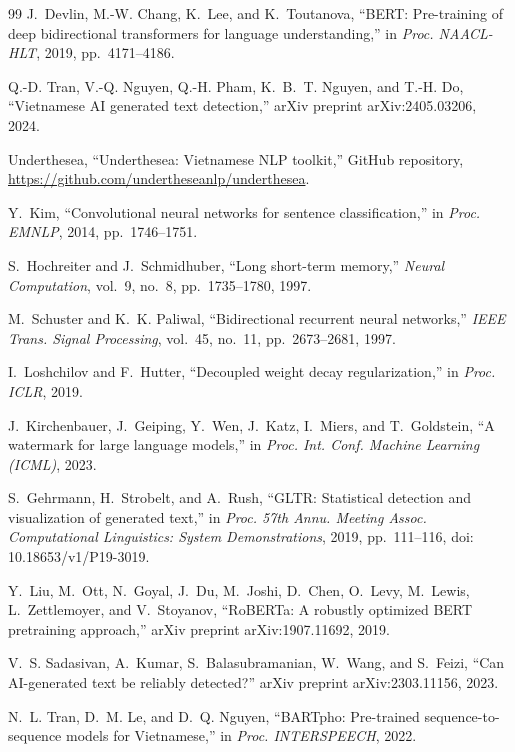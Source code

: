 \documentclass[conference,a4paper]{IEEEtran}
\begin{document}
\begin{thebibliography}{99}
J.~Devlin, M.-W. Chang, K.~Lee, and K.~Toutanova, ``BERT: Pre-training of deep bidirectional transformers for language understanding,'' in \emph{Proc. NAACL-HLT}, 2019, pp.~4171--4186.

Q.-D. Tran, V.-Q. Nguyen, Q.-H. Pham, K.~B.~T. Nguyen, and T.-H. Do, ``Vietnamese AI generated text detection,'' arXiv preprint arXiv:2405.03206, 2024.

Underthesea, ``Underthesea: Vietnamese NLP toolkit,'' GitHub repository, \url{https://github.com/undertheseanlp/underthesea}.

Y.~Kim, ``Convolutional neural networks for sentence classification,'' in \emph{Proc. EMNLP}, 2014, pp.~1746--1751.

S.~Hochreiter and J.~Schmidhuber, ``Long short-term memory,'' \emph{Neural Computation}, vol.~9, no.~8, pp.~1735--1780, 1997.

M.~Schuster and K.~K. Paliwal, ``Bidirectional recurrent neural networks,'' \emph{IEEE Trans. Signal Processing}, vol.~45, no.~11, pp.~2673--2681, 1997.

I.~Loshchilov and F.~Hutter, ``Decoupled weight decay regularization,'' in \emph{Proc. ICLR}, 2019.

J.~Kirchenbauer, J.~Geiping, Y.~Wen, J.~Katz, I.~Miers, and T.~Goldstein, ``A watermark for large language models,'' in \emph{Proc. Int. Conf. Machine Learning (ICML)}, 2023.

S.~Gehrmann, H.~Strobelt, and A.~Rush, ``GLTR: Statistical detection and visualization of generated text,'' in \emph{Proc. 57th Annu. Meeting Assoc. Computational Linguistics: System Demonstrations}, 2019, pp.~111--116, doi: 10.18653/v1/P19-3019.

Y.~Liu, M.~Ott, N.~Goyal, J.~Du, M.~Joshi, D.~Chen, O.~Levy, M.~Lewis, L.~Zettlemoyer, and V.~Stoyanov, ``RoBERTa: A robustly optimized BERT pretraining approach,'' arXiv preprint arXiv:1907.11692, 2019.

V.~S. Sadasivan, A.~Kumar, S.~Balasubramanian, W.~Wang, and S.~Feizi, ``Can AI-generated text be reliably detected?'' arXiv preprint arXiv:2303.11156, 2023.

N.~L. Tran, D.~M. Le, and D.~Q. Nguyen, ``BARTpho: Pre-trained sequence-to-sequence models for Vietnamese,'' in \emph{Proc. INTERSPEECH}, 2022.

\end{thebibliography}
\end{document}
